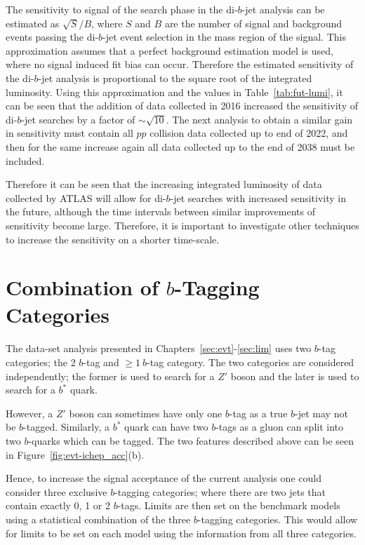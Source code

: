 The sensitivity to signal of the search phase in the di-$b$-jet analysis can be estimated as $\sqrt{S}/B$,
where $S$ and $B$ are the number of signal and background events passing the di-$b$-jet event selection in the mass region of the signal.
This approximation assumes that a perfect background estimation model is used, where no signal induced fit bias can occur.
Therefore the estimated sensitivity of the di-$b$-jet analysis is proportional to the square root of the integrated luminosity.
Using this approximation and the values in Table~\ref{tab:fut-lumi}, it can be seen that the addition of data collected in 2016
increased the sensitivity of di-$b$-jet searches by a factor of $\sim\sqrt{10}$.
The next analysis to obtain a similar gain in sensitivity must contain all $pp$ collision data collected up to end of 2022,
and then for the same increase again all data collected up to the end of 2038 must be included.

Therefore it can be seen that the increasing integrated luminosity of data collected by ATLAS will
allow for di-$b$-jet searches with increased sensitivity in the future,
although the time intervals between similar improvements of sensitivity become large.
Therefore, it is important to investigate other techniques to increase the sensitivity on a shorter time-scale.

\section{Combination of $b$-Tagging Categories}

The \summer{} data-set analysis presented in Chapters~\ref{sec:evt}-\ref{sec:lim} uses
two $b$-tag categories; the 2 $b$-tag and $\geq1~b$-tag category.
The two categories are considered independently;
the former is used to search for a $Z'$ boson and the later is used to search for a $b^{*}$ quark.

However, a $Z'$ boson can sometimes have only one $b$-tag as a true $b$-jet may not be $b$-tagged.
Similarly, a $b^*$ quark can have two $b$-tags as a gluon can split into two $b$-quarks which can be tagged.
The two features described above can be seen in Figure~\ref{fig:evt-ichep_acc}(b).

Hence, to increase the signal acceptance of the current analysis one could consider three exclusive $b$-tagging categories;
where there are two jets that contain exactly 0, 1 or 2 $b$-tags.
Limits are then set on the benchmark models using a statistical combination of the three $b$-tagging categories.
This would allow for limits to be set on each model using the information from all three categories.


